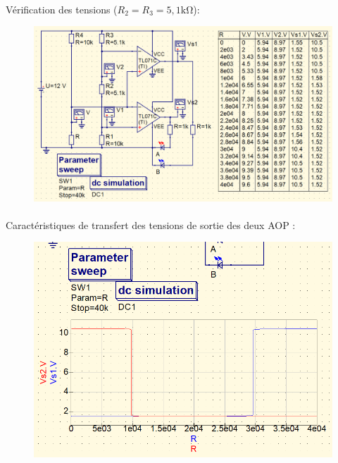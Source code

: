 \documentclass{article}
\begin{document}
\paragraph{}
Vérification des tensions ($R_2 = R_3 = 5,1 \si{\kilo\ohm}$):
\begin{figure}[H]
    \centering
    \includegraphics[width=\linewidth]{./images/labo4-qucs-mesures.png}
\end{figure}

\newpage
\paragraph{}
Caractéristiques de transfert des tensions de sortie des deux AOP :
\begin{figure}[H]
    \centering
    \includegraphics[width=\linewidth]{./images/labo4-qucs-caract-transfert.png}
\end{figure}
\end{document}
